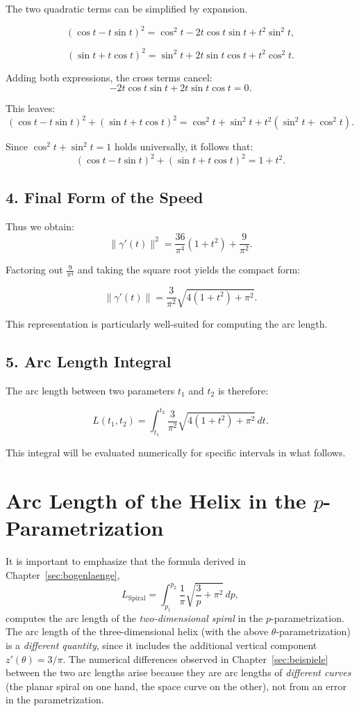 The two quadratic terms can be simplified by expansion.

\[
(\cos t - t\sin t)^{2}
= \cos^{2}t - 2t\cos t\sin t + t^{2}\sin^{2}t,
\]

\[
(\sin t + t\cos t)^{2}
= \sin^{2}t + 2t\sin t\cos t + t^{2}\cos^{2}t.
\]

Adding both expressions, the cross terms cancel:
\[
-2t\cos t\sin t + 2t\sin t\cos t = 0.
\]

This leaves:
\[
(\cos t - t\sin t)^{2} + (\sin t + t\cos t)^{2}
= \cos^{2}t + \sin^{2}t + t^{2}(\sin^{2}t + \cos^{2}t).
\]

Since $\cos^{2}t + \sin^{2}t = 1$ holds universally, it follows that:
\[
(\cos t - t\sin t)^{2} + (\sin t + t\cos t)^{2}
= 1 + t^{2}.
\]

\subsection*{4. Final Form of the Speed}

Thus we obtain:
\[
\|\gamma'(t)\|^{2}
= \frac{36}{\pi^{4}}(1+t^{2}) + \frac{9}{\pi^{2}}.
\]

Factoring out $\frac{9}{\pi^4}$ and taking the square root yields the compact form:

\[
\boxed{
\|\gamma'(t)\|
= \frac{3}{\pi^{2}}\sqrt{4(1+t^{2}) + \pi^{2}}
}.
\]

This representation is particularly well-suited for computing the arc length.

\subsection*{5. Arc Length Integral}

The arc length between two parameters $t_1$ and $t_2$ is therefore:

\[
\boxed{
L(t_{1},t_{2})
= \int_{t_{1}}^{t_{2}}
\frac{3}{\pi^{2}}\sqrt{4(1+t^{2}) + \pi^{2}}\,dt.
}
\]

This integral will be evaluated numerically for specific intervals in what follows.
\section{Arc Length of the Helix in the $p$-Parametrization}

It is important to emphasize that the formula derived in Chapter~\ref{sec:bogenlaenge},
\begin{equation}
L_{\mathrm{Spiral}} = \int_{p_1}^{p_2}
\frac{1}{\pi}\sqrt{\frac{3}{p} + \pi^2}\, dp,
\end{equation}
computes the arc length of the \emph{two-dimensional spiral} in the $p$-parametrization.
The arc length of the three-dimensional helix (with the above
$\theta$-parametrization) is a \emph{different quantity}, since it includes the additional
vertical component $z'(\theta) = 3/\pi$. The numerical differences
observed in Chapter~\ref{sec:beispiele} between the two arc lengths arise
because they are arc lengths of \emph{different curves}
(the planar spiral on one hand, the space curve on the other), not from an error
in the parametrization.

